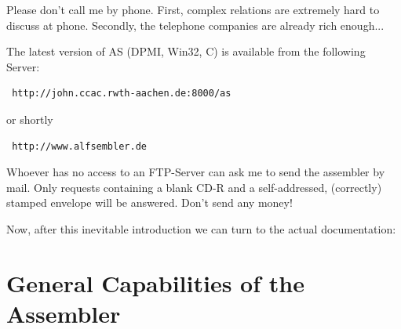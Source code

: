 \documentclass[12pt,twoside]{report}
\newcommand{\asname}{{AS}}
\begin{document}
Please don't call me by phone.  First, complex relations are
extremely hard to discuss at phone.  Secondly, the telephone
companies are already rich enough...

The latest version of \asname{} (DPMI, Win32, C) is available from
the following Server:
\begin{verbatim}
 http://john.ccac.rwth-aachen.de:8000/as
\end{verbatim}
or shortly
\begin{verbatim}
 http://www.alfsembler.de
\end{verbatim}

Whoever has no access to an FTP-Server can ask me to send the assembler
by mail.  Only requests containing a blank CD-R and a self-addressed,
(correctly) stamped envelope will be answered.  Don't send any money!

Now, after this inevitable introduction we can turn to the actual
documentation:


\section{General Capabilities of the Assembler}
\end{document}
